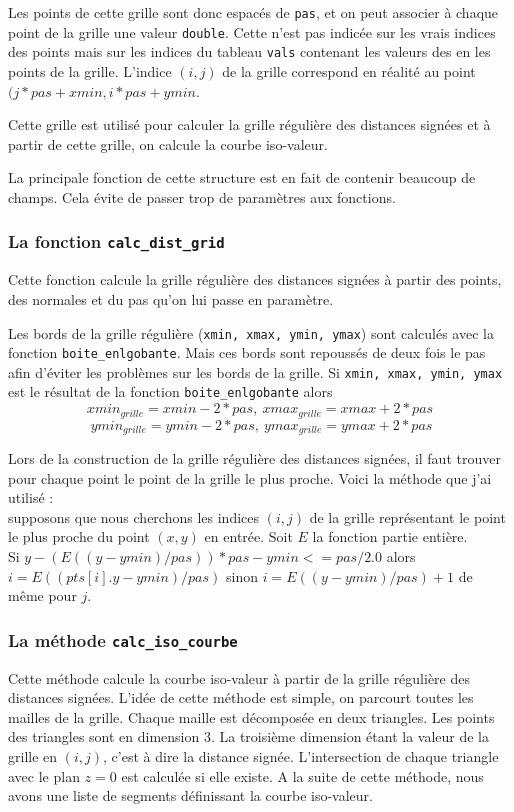 \documentclass[11pt,a4paper]{article}
\begin{document}
Les points de cette grille sont donc espacés de {\tt pas}, et on peut associer à chaque point de la grille une valeur {\tt double}.
Cette n'est pas indicée sur les vrais indices des points mais sur les indices du tableau {\tt vals} contenant les valeurs des en les points
de la grille. L'indice $(i,j)$ de la grille correspond en réalité au point $(j*pas+xmin,i*pas+ymin $.

Cette grille est utilisé pour calculer la grille régulière des distances signées et à partir de cette grille, on calcule la courbe iso-valeur.

La principale fonction de cette structure est en fait de contenir beaucoup de champs.
Cela évite de passer trop de paramètres aux fonctions.

\subsubsection{La fonction {\tt calc\_dist\_grid}}
Cette fonction calcule la grille régulière des distances signées à partir des points, des normales et du pas qu'on lui passe en paramètre.

Les bords de la grille régulière ({\tt xmin, xmax, ymin, ymax}) sont calculés avec la fonction {\tt boite\_enlgobante}. Mais ces bords sont
repoussés de deux fois le pas afin d'éviter les problèmes sur les bords de la grille. Si {\tt xmin, xmax, ymin, ymax} est le résultat de
la fonction {\tt boite\_enlgobante} alors $$xmin_{grille}=xmin-2*pas,~xmax_{grille}=xmax+2*pas$$
$$~ymin_{grille}=ymin-2*pas,~ ymax_{grille}=ymax+2*pas $$

Lors de la construction de la grille régulière des distances signées, il faut trouver pour chaque point le point de la grille le plus proche.
Voici la méthode que j'ai utilisé :\\
supposons que nous cherchons les indices $(i,j)$ de la grille représentant le point le plus proche du point $(x,y)$ en entrée. Soit $E$ la fonction
partie entière.\\ Si $y-(E((y-ymin)/pas))*pas-ymin<=pas/2.0$ alors $i=E((pts[i].y-ymin)/pas)$ sinon $i=E((y-ymin)/pas)+1$ de même pour $j$.

\subsubsection{La méthode {\tt calc\_iso\_courbe}}
Cette méthode calcule la courbe iso-valeur à partir de la grille régulière des distances signées. L'idée de cette méthode est simple, on parcourt
toutes les mailles de la grille. Chaque maille est décomposée en deux triangles. Les points des triangles sont en dimension 3. La troisième dimension
étant la valeur de la grille en $(i,j)$, c'est à dire la distance signée. L'intersection de chaque triangle avec le plan $z=0$ est calculée si elle existe.
A la suite de cette méthode, nous avons une liste de segments définissant la courbe iso-valeur.
\end{document}
